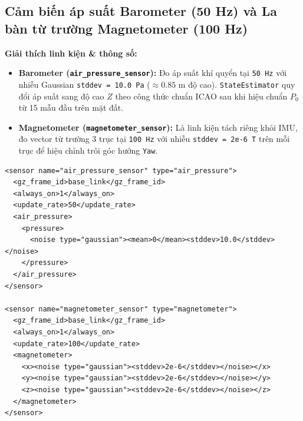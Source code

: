 \documentclass[11pt,a4paper]{article}
\begin{document}
\vspace{1em}

\subsection{Cảm biến áp suất Barometer (50 Hz) và La bàn từ trường Magnetometer (100 Hz)}
\noindent
\begin{minipage}[t]{0.45\textwidth}
\vspace{0pt}
\textbf{Giải thích linh kiện \& thông số:}
\begin{itemize}
    \item \textbf{Barometer (\texttt{air\_pressure\_sensor}):} Đo áp suất khí quyển tại \texttt{50 Hz} với nhiễu Gaussian \texttt{stddev = 10.0 Pa} ($\approx 0.85\text{ m}$ độ cao). \texttt{StateEstimator} quy đổi áp suất sang độ cao $Z$ theo công thức chuẩn ICAO sau khi hiệu chuẩn $P_0$ từ 15 mẫu đầu trên mặt đất.
    \item \textbf{Magnetometer (\texttt{magnetometer\_sensor}):} Là linh kiện tách riêng khỏi IMU, đo vector từ trường 3 trục tại \texttt{100 Hz} với nhiễu \texttt{stddev = 2e-6 T} trên mỗi trục để hiệu chỉnh trôi góc hướng \texttt{Yaw}.
\end{itemize}
\end{minipage}
\hfill
\begin{minipage}[t]{0.52\textwidth}
\vspace{0pt}
\begin{lstlisting}[language=SDF, firstnumber=219]
<sensor name="air_pressure_sensor" type="air_pressure">
  <gz_frame_id>base_link</gz_frame_id>
  <always_on>1</always_on>
  <update_rate>50</update_rate>
  <air_pressure>
    <pressure>
      <noise type="gaussian"><mean>0</mean><stddev>10.0</stddev></noise>
    </pressure>
  </air_pressure>
</sensor>

<sensor name="magnetometer_sensor" type="magnetometer">
  <gz_frame_id>base_link</gz_frame_id>
  <always_on>1</always_on>
  <update_rate>100</update_rate>
  <magnetometer>
    <x><noise type="gaussian"><stddev>2e-6</stddev></noise></x>
    <y><noise type="gaussian"><stddev>2e-6</stddev></noise></y>
    <z><noise type="gaussian"><stddev>2e-6</stddev></noise></z>
  </magnetometer>
</sensor>
\end{lstlisting}
\end{minipage}

\vspace{1em}
\end{document}
